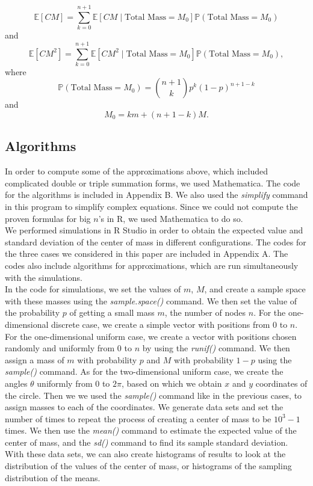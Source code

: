 \documentclass[11pt, twoside, reqno]{book}
\newcommand{\E}{\mathbb{E}}
\begin{document}
$$\E[CM] = \sum_{k=0}^{n+1} \E[CM \mid \text{Total Mass} = M_{0}] \mathbb{P}(\text{Total Mass} = M_{0})$$
and
$$\E[CM^{2}] =  \sum_{k=0}^{n+1} \E[CM^{2} \mid \text{Total Mass} = M_{0}] \mathbb{P}(\text{Total Mass} = M_{0}),$$
where
$$\mathbb{P}(\text{Total Mass} = M_{0}) = \binom{n+1}{k} p^{k} (1-p)^{n+1-k}$$ and
$$M_{0} = km+(n+1-k)M.$$

\subsection{Algorithms}

In order to compute some of the approximations above, which included complicated double or triple summation forms, we used Mathematica. The code for the algorithms is included in Appendix B. We also used the \textit{simplify} command in this program to simplify complex equations. Since we could not compute the proven formulas for big $n$'s in R, we used Mathematica to do so. \\
We performed simulations in R Studio in order to obtain the expected value and standard deviation of the center of mass in different configurations. The codes for the three cases we considered in this paper are included in Appendix A. The codes also include algorithms for approximations, which are run simultaneously with the simulations. \\
In the code for simulations, we set the values of $m$, $M$, and create a sample space with these masses using the \textit{sample.space()} command. We then set the value of the probability $p$ of getting a small mass $m$, the number of nodes $n$. For the one-dimensional discrete case, we create a simple vector with positions from $0$ to $n$. For the one-dimensional uniform case, we create a vector with positions chosen randomly and uniformly from $0$ to $n$ by using the \textit{runif()} command. We then assign a mass of $m$ with probability $p$ and $M$ with probability $1-p$ using the \textit{sample()} command. As for the two-dimensional uniform case, we create the angles $\theta$ uniformly from $0$ to $2\pi$, based on which we obtain $x$ and $y$ coordinates of the circle. Then we we used the \textit{sample()} command like in the previous cases, to assign masses to each of the coordinates. We generate data sets and set the number of times to repeat the process of creating a center of mass to be $10^{3}-1$ times. We then use the \textit{mean()} command to estimate the expected value of the center of mass, and the \textit{sd()} command to find its sample standard deviation. With these data sets, we can also create histograms of results to look at the distribution of the values of the center of mass, or histograms of the sampling distribution of the means. \\
\end{document}
